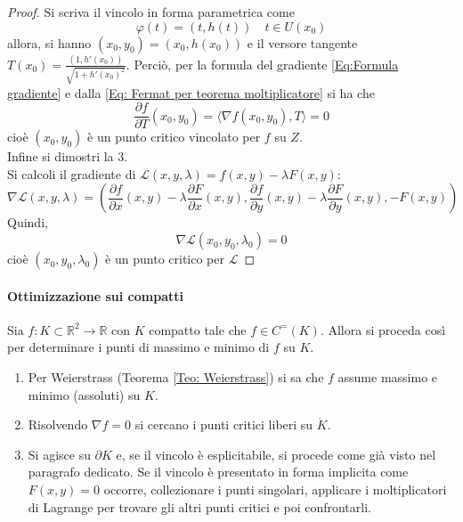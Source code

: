 \begin{proof}
    Si scriva il vincolo in forma parametrica come
    \begin{equation}
        \varphi(t)=(t, h(t)) \quad t \in U(x_0)
    \end{equation}
    allora, si hanno $(x_0, y_0)=(x_0, h(x_0))$ e il versore tangente $T(x_0)=\tfrac{(1, h'(x_0))}{\sqrt{1+h'(x_0)^2}}$.
    Perciò, per la formula del gradiente \eqref{Eq:Formula gradiente}
    e dalla \eqref{Eq: Fermat per teorema moltiplicatore}
    si ha che
    \begin{equation}
        \frac{\partial{f}}{\partial{T}}(x_0, y_0)= \langle \nabla f(x_0, y_0), T\rangle = 0
    \end{equation}
    cioè $(x_0, y_0)$ è un punto critico vincolato per $f$ su $Z$.\\
    Infine si dimostri la 3.\\
    Si calcoli il gradiente di $\mathcal{L}(x, y, \lambda)=f(x, y)-\lambda F(x, y)$:
    \begin{equation}
        \nabla \mathcal{L}(x,y,\lambda)=\left(\frac{\partial{f}}{\partial{x}}(x, y)-\lambda \frac{\partial{F}}{\partial{x}}(x, y), \frac{\partial{f}}{\partial{y}}(x, y)-\lambda \frac{\partial{F}}{\partial{y}}(x, y), -F(x, y)\right)
    \end{equation}
    Quindi,
    \begin{equation}
     \nabla \mathcal{L}(x_0, y_0, \lambda_0)=0   
    \end{equation}
    cioè $(x_0, y_0, \lambda_0)$ è un punto critico per $\mathcal{L}$
\end{proof}
\paragraph{Ottimizzazione sui compatti}
Sia $f: K \subset \mathbb{R}^2 \to \mathbb{R}$ con $K$ compatto tale che $f \in C^=(K)$. Allora si proceda così per determinare i punti di massimo e minimo di $f$ su $K$.
\begin{enumerate}
    \item Per Weierstrass (Teorema \ref{Teo: Weierstrass}) si sa che $f$ assume massimo e minimo (assoluti) su $K$.
    \item Risolvendo $\nabla f=0$ si cercano i punti critici liberi su $\mathring{K}$.
    \item Si agisce su $\partial K$ e, se il vincolo è esplicitabile, si procede come già visto nel paragrafo dedicato. Se il vincolo è presentato in forma implicita come $F(x,y)=0$ occorre, collezionare i punti singolari, applicare i moltiplicatori di Lagrange per trovare gli altri punti critici e poi confrontarli.
\end{enumerate}